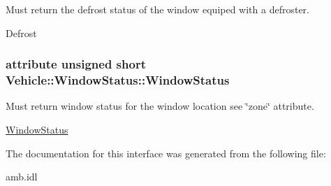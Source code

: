 Must return the defrost status of the window equiped with a defroster. 

Defrost \hypertarget{interfaceVehicle_1_1WindowStatus_a8838fdb02764a348229724082a168910}{
\subsubsection[{Window\-Status}]{\setlength{\rightskip}{0pt plus 5cm}attribute unsigned short Vehicle\-::\-Window\-Status\-::\-Window\-Status}}\label{interfaceVehicle_1_1WindowStatus_a8838fdb02764a348229724082a168910}


Must return window status for the window location see \char`\"{}zone\char`\"{} attribute. 

\hyperlink{interfaceVehicle_1_1WindowStatus}{Window\-Status} 

The documentation for this interface was generated from the following file\-:\begin{DoxyCompactItemize}
\item 
amb.\-idl\end{DoxyCompactItemize}
